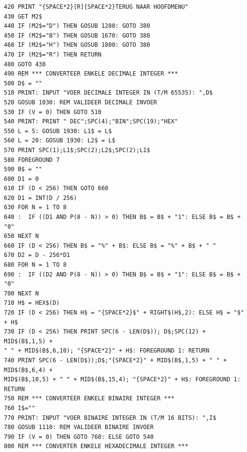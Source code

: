 \begin{tcolorbox}[colback=black,coltext=white]
\verbatimfont{\codefont}
\begin{verbatim}
420 PRINT "{SPACE*2}[R]{SPACE*2}TERUG NAAR HOOFDMENU"
430 GET M2$
440 IF (M2$="D") THEN GOSUB 1280: GOTO 380
450 IF (M2$="B") THEN GOSUB 1670: GOTO 380
460 IF (M2$="H") THEN GOSUB 1800: GOTO 380
470 IF (M2$="R") THEN RETURN
480 GOTO 430
490 REM *** CONVERTEER ENKELE DECIMALE INTEGER ***
500 D$ = ""
510 PRINT: INPUT "VOER DECIMALE INTEGER IN (T/M 65535): ",D$
520 GOSUB 1030: REM VALIDEER DECIMALE INVOER
530 IF (V = 0) THEN GOTO 510
540 PRINT: PRINT " DEC";SPC(4);"BIN";SPC(19);"HEX"
550 L = 5: GOSUB 1930: L1$ = L$
560 L = 20: GOSUB 1930: L2$ = L$
570 PRINT SPC(1);L1$;SPC(2);L2$;SPC(2);L1$
580 FOREGROUND 7
590 B$ = ""
600 D1 = 0
610 IF (D < 256) THEN GOTO 660
620 D1 = INT(D / 256)
630 FOR N = 1 TO 8
640 :  IF ((D1 AND P(8 - N)) > 0) THEN B$ = B$ + "1": ELSE B$ = B$ + "0"
650 NEXT N
660 IF (D < 256) THEN B$ = "%" + B$: ELSE B$ = "%" + B$ + " "
670 D2 = D - 256*D1
680 FOR N = 1 TO 8
690 :  IF ((D2 AND P(8 - N)) > 0) THEN B$ = B$ + "1": ELSE B$ = B$ + "0"
700 NEXT N
710 H$ = HEX$(D)
720 IF (D < 256) THEN H$ = "{SPACE*2}$" + RIGHT$(H$,2): ELSE H$ = "$" + H$
730 IF (D < 256) THEN PRINT SPC(6 - LEN(D$)); D$;SPC(12) + MID$(B$,1,5) +
" " + MID$(B$,6,10); "{SPACE*2}" + H$: FOREGROUND 1: RETURN
740 PRINT SPC(6 - LEN(D$));D$;"{SPACE*2}" + MID$(B$,1,5) + " " + MID$(B$,6,4) +
MID$(B$,10,5) + " " + MID$(B$,15,4); "{SPACE*2}" + H$: FOREGROUND 1: RETURN
750 REM *** CONVERTEER ENKELE BINAIRE INTEGER ***
760 I$=""
770 PRINT: INPUT "VOER BINAIRE INTEGER IN (T/M 16 BITS): ",I$
780 GOSUB 1110: REM VALIDEER BINAIRE INVOER
790 IF (V = 0) THEN GOTO 760: ELSE GOTO 540
800 REM *** CONVERTER ENKELE HEXADECIMALE INTEGER ***
\end{verbatim}
\end{tcolorbox}
